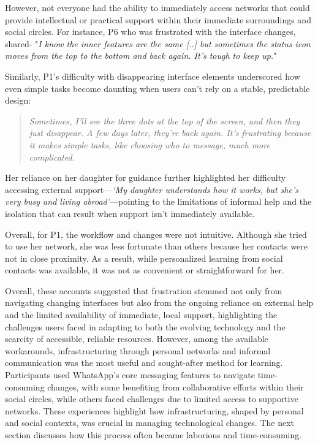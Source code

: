 However, not everyone had the ability to immediately access networks that could provide intellectual or practical support within their immediate surroundings and social circles. For instance, P6 who was frustrated with the interface changes, shared- "\textit{I know the inner features are the same [..] but sometimes the status icon moves from the top to the bottom and back again. It’s tough to keep up.}" 

Similarly, P1’s difficulty with disappearing interface elements underscored how even simple tasks become daunting when users can’t rely on a stable, predictable design:

\begin{quote} \textit{Sometimes, I’ll see the three dots at the top of the screen, and then they just disappear. A few days later, they’re back again. It’s frustrating because it makes simple tasks, like choosing who to message, much more complicated.} \end{quote}

Her reliance on her daughter for guidance further highlighted her difficulty accessing external support—\textit{‘My daughter understands how it works, but she's very busy and living abroad’}—pointing to the limitations of informal help and the isolation that can result when support isn't immediately available.

Overall, for P1, the workflow and changes were not intuitive. Although she tried to use her network, she was less fortunate than others because her contacts were not in close proximity. As a result, while personalized learning from social contacts was available, it was not as convenient or straightforward for her.


Overall, these accounts suggested that frustration stemmed not only from navigating changing interfaces but also from the ongoing reliance on external help and the limited availability of immediate, local support, highlighting the challenges users faced in adapting to both the evolving technology and the scarcity of accessible, reliable resources. However, among the available workarounds, infrastructuring through personal networks and informal communication was the most useful and sought-after method for learning. Participants used WhatsApp’s core messaging features to navigate time-consuming changes, with some benefiting from collaborative efforts within their social circles, while others faced challenges due to limited access to supportive networks. These experiences highlight how infrastructuring, shaped by personal and social contexts, was crucial in managing technological changes. The next section discusses how this process often became laborious and time-consuming.

